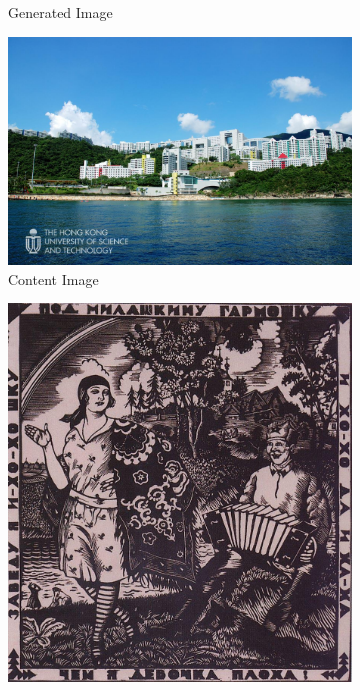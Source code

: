 \documentclass{article}
\begin{document}
\begin{figure}[h!]
\begin{minipage}{\textwidth}
\begin{subfigure}{0.25\textwidth}
            \caption{Generated Image}
        \end{subfigure}
    \end{minipage}
    
    \vspace{0.1cm}

    \begin{minipage}{\textwidth}
        \centering
        \begin{subfigure}{0.25\textwidth}
            \includegraphics[width=\textwidth]{./data_set/HKUST/6.jpeg}
            \caption{Content Image}
        \end{subfigure}
        \hfill %
        \begin{subfigure}{0.25\textwidth}
            \includegraphics[width=\textwidth]{./wikiart/Art_Nouveau_Modern/boris-kustodiev_under-honey-s-harmonica-1927.jpg}

\end{subfigure}
\end{minipage}
\end{figure}
\end{document}
